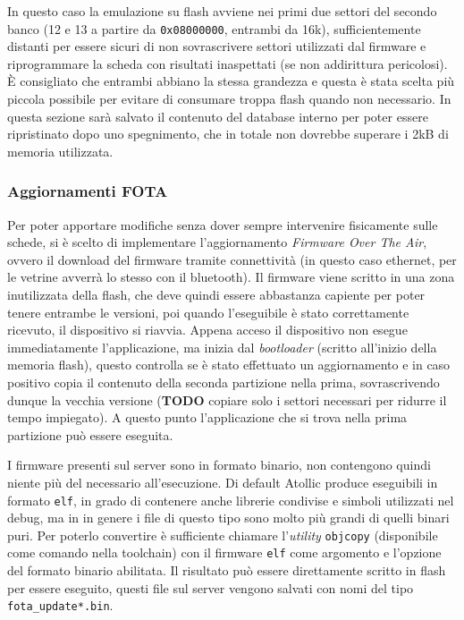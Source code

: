 In questo caso la emulazione su flash avviene nei primi due settori del secondo banco (12 e 13 a partire da \texttt{0x08000000}, entrambi da 16k), sufficientemente distanti per essere sicuri di non sovrascrivere settori utilizzati dal firmware e riprogrammare la scheda con risultati inaspettati (se non addirittura pericolosi). \`E consigliato che entrambi abbiano la stessa grandezza e questa \`e stata scelta pi\`u piccola possibile per evitare di consumare troppa flash quando non necessario. In questa sezione sar\`a salvato il contenuto del database interno per poter essere ripristinato dopo uno spegnimento, che in totale non dovrebbe superare i 2kB di memoria utilizzata.

\subsubsection{Aggiornamenti FOTA}

Per poter apportare modifiche senza dover sempre intervenire fisicamente sulle schede, si \`e scelto di implementare l'aggiornamento \textit{Firmware Over The Air}, ovvero il download del firmware tramite connettivit\`a (in questo caso ethernet, per le vetrine avverr\`a lo stesso con il bluetooth). Il firmware viene scritto in una zona inutilizzata della flash, che deve quindi essere abbastanza capiente per poter tenere entrambe le versioni, poi quando l'eseguibile \`e stato correttamente ricevuto, il dispositivo si riavvia. Appena acceso il dispositivo non esegue immediatamente l'applicazione, ma inizia dal \textit{bootloader} (scritto all'inizio della memoria flash), questo controlla se \`e stato effettuato un aggiornamento e in caso positivo copia il contenuto della seconda partizione nella prima, sovrascrivendo dunque la vecchia versione (\textbf{TODO} copiare solo i settori necessari per ridurre il tempo impiegato). A questo punto l'applicazione che si trova nella prima partizione pu\`o essere eseguita.

I firmware presenti sul server sono in formato binario, non contengono quindi niente pi\`u del necessario all'esecuzione. Di default Atollic produce eseguibili in formato \texttt{elf}, in grado di contenere anche librerie condivise e simboli utilizzati nel debug, ma in in genere i file di questo tipo sono molto pi\`u grandi di quelli binari puri. Per poterlo convertire \`e sufficiente chiamare l'\textit{utility} \texttt{objcopy} (disponibile come comando nella toolchain) con il firmware \texttt{elf} come argomento e l'opzione del formato binario abilitata. Il risultato pu\`o essere direttamente scritto in flash per essere eseguito, questi file sul server vengono salvati con nomi del tipo \texttt{fota\_update*.bin}.

